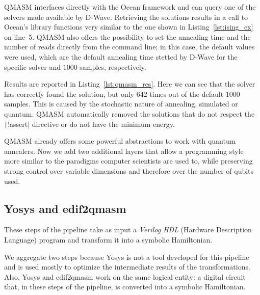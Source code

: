 QMASM interfaces directly with the Ocean framework and can query one of the solvers made available by D-Wave. Retrieving the solutions results in a call to Ocean’s library functions very similar to the one shown in Listing~\ref{lst:ising_ex} on line~5. QMASM also offers the possibility to set the annealing time and the number of reads directly from the command line; in this case, the default values were used, which are the default annealing time stetted by D-Wave for the specific solver and $1000$ samples, respectively.

Results are reported in Listing~\ref{lst:qmasm_res}. Here we can see that the solver has correctly found the solution, but only $642$ times out of the default $1000$ samples. This is caused by the stochastic nature of annealing, simulated or quantum. QMASM automatically removed the solutions that do not respect the \texttt|!assert| directive or do not have the minimum energy.

\begin{listingenv}[h]
	\caption{Circuit satisfiability results}
	\label{lst:qmasm_res}
\end{listingenv}

QMASM already offers some powerful abstractions to work with quantum annealers. Now we add two additional layers that allow a programming style more similar to the paradigms computer scientists are used to, while preserving strong control over variable dimensions and therefore over the number of qubits used.

\subsection{Yosys and edif2qmasm}
\label{sec:yosys_edif2qmasm}
These steps of the pipeline take as input a \emph{Verilog HDL} (Hardware Description Language) program and transform it into a symbolic Hamiltonian. 

We aggregate two steps because Yosys is not a tool developed for this pipeline and is used mostly to optimize the intermediate results of the transformations. Also, Yosys and edif2qmasm work on the same logical entity: a digital circuit that, in these steps of the pipeline, is converted into a symbolic Hamiltonian.

